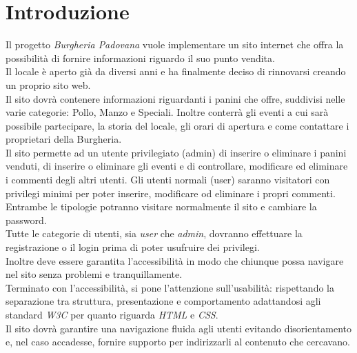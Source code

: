 \section{Introduzione}
Il progetto \emph{Burgheria Padovana} vuole implementare un sito internet che offra la possibilità di fornire informazioni riguardo il suo punto vendita.\\
Il locale è aperto già da diversi anni e ha finalmente deciso di rinnovarsi creando un proprio sito web.\\
Il sito dovrà contenere informazioni riguardanti i panini che offre, suddivisi nelle varie categorie: Pollo, Manzo e Speciali. 
Inoltre conterrà gli eventi a cui sarà possibile partecipare, la storia del locale, gli orari di apertura e come contattare i proprietari della Burgheria.\\
Il sito permette ad un utente privilegiato (admin) di inserire o eliminare i panini venduti, di inserire o eliminare gli eventi e di controllare, modificare ed eliminare i commenti degli altri utenti. Gli utenti normali (user) saranno visitatori con privilegi minimi per poter inserire, modificare od eliminare i propri commenti.\\
Entrambe le tipologie potranno visitare normalmente il sito e cambiare la password.\\
Tutte le categorie di utenti, sia \emph{user} che \emph{admin}, dovranno effettuare la registrazione o il login prima di poter usufruire dei privilegi.\\
Inoltre deve essere garantita l'accessibilità in modo che chiunque possa navigare nel sito senza problemi e tranquillamente.\\
Terminato con l'accessibilità, si pone l'attenzione sull'usabilità: rispettando la separazione tra struttura, presentazione e comportamento adattandosi agli standard \emph{W3C} per quanto riguarda \emph{HTML} e \emph{CSS}.\\
Il sito dovrà garantire una navigazione fluida agli utenti evitando disorientamento e, nel caso accadesse, fornire supporto per indirizzarli al contenuto che cercavano.